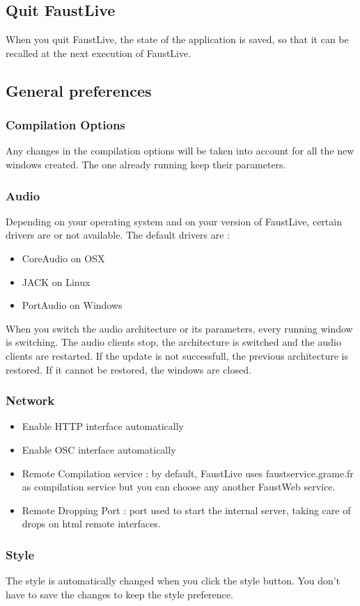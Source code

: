 \documentclass[a4paper]{article}
\begin{document}
\subsection{Quit FaustLive}

When you quit FaustLive, the state of the application is saved, so that it can be recalled at the next execution of FaustLive.

\subsection{General preferences}
\subsubsection{Compilation Options}
Any changes in the compilation options will be taken into account for all the new windows created. The one already running keep their parameters.
\subsubsection{Audio}
 
Depending on your operating system and on your version of FaustLive, certain drivers are or not available.
The default drivers are :
\begin{itemize}
\item CoreAudio on OSX
\item JACK on Linux
\item PortAudio on Windows
\end{itemize}

When you switch the audio architecture or its parameters, every running window is switching. The audio clients stop, the architecture is switched and the audio clients are restarted. If the update is not successfull, the previous architecture is restored. If it cannot be restored, the windows are closed. 

\subsubsection{Network}
\begin{itemize}
\item Enable HTTP interface automatically
\item Enable OSC interface automatically
\item Remote Compilation service : by default, FaustLive uses faustservice.grame.fr as compilation service but you can choose any another FaustWeb service.
\item Remote Dropping Port : port used to start the internal server, taking care of drops on html remote interfaces.

\end{itemize}

\subsubsection{Style}
The style is automatically changed when you click the style button. You don't have to save the changes to keep the style preference. 

%
\end{document}
